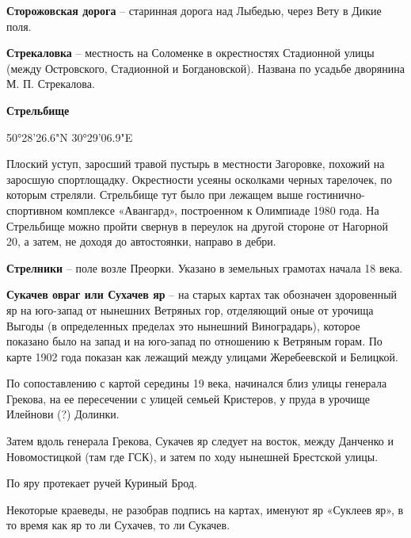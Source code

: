 \medskip

\textbf{Сторожовская дорога} – старинная дорога над Лыбедью, через Вету в Дикие поля.\\

\medskip

\textbf{Стрекаловка} – местность на Соломенке в окрестностях Стадионной улицы (между Островского, Стадионной и Богдановской). Названа по усадьбе дворянина М. П. Стрекалова.\\

\medskip

\textbf{Стрельбище}

50°28'26.6"N 30°29'06.9"E

Плоский уступ, заросший травой пустырь в местности Загоровке, похожий на заросшую спортлощадку. Окрестности усеяны осколками черных тарелочек, по которым стреляли. Стрельбище тут было при лежащем выше  гости\-нично-спортивном комплексе «Авангард», построенном к Олимпиаде 1980 года. На Стрельбище можно пройти свернув в переулок на другой стороне от Нагорной 20, а затем, не доходя до автостоянки, направо в дебри.\\

\medskip

\textbf{Стрелники} – поле возле Преорки. Указано в земельных грамотах начала 18 века.\\

\medskip

\textbf{Сукачев овраг или Сухачев яр} – на старых картах так обозначен здоровенный яр на юго-запад от нынешних Ветряных гор, отделяющий оные от урочища Выгоды (в определенных пределах это нынешний Виноградарь), которое показано было на запад и на юго-запад по отношению к Ветряным горам. По карте 1902 года показан как лежащий между улицами Жеребеевской и Белицкой.

По сопоставлению с картой середины 19 века, начинался близ улицы генерала Грекова, на ее пересечении с улицей семьей Кристеров, у пруда в урочище Илейнови (?) Долинки.

Затем вдоль генерала Грекова, Сукачев яр следует на восток, между Данченко и Новомостицкой (там где ГСК), и затем по ходу нынешней Брестской улицы.

По яру протекает ручей Куриный Брод.

Некоторые краеведы, не разобрав подпись на картах, именуют яр «Суклеев яр», в то время как яр то ли Сухачев, то ли Сукачев.\\

\medskip

